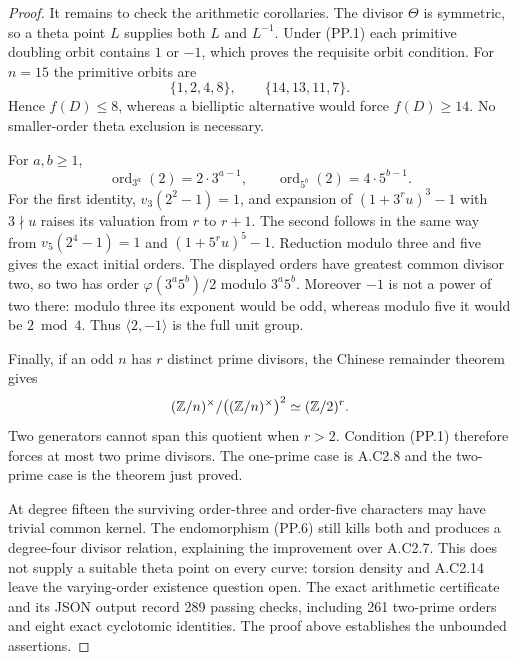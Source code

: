 \begin{proof}
It remains to check the arithmetic corollaries.
The divisor $\Theta$ is symmetric, so a theta point
$L$ supplies both $L$ and $L^{-1}$. Under (PP.1)
each primitive doubling orbit contains $1$ or $-1$,
which proves the requisite orbit condition.
For $n=15$ the primitive orbits are
\[
              \{1,2,4,8\},\qquad \{14,13,11,7\}.
\]
Hence $f(D)\le8$, whereas a bielliptic alternative
would force $f(D)\ge14$. No smaller-order
theta exclusion is necessary.

For $a,b\ge1$,
\[
 \operatorname{ord}_{3^a}(2)=2\cdot3^{a-1},\qquad
 \operatorname{ord}_{5^b}(2)=4\cdot5^{b-1}.
\]
For the first identity, $v_3(2^2-1)=1$, and expansion
of $(1+3^ru)^3-1$ with $3\nmid u$ raises its valuation
from $r$ to $r+1$. The second follows in the same
way from $v_5(2^4-1)=1$ and
$(1+5^ru)^5-1$. Reduction modulo three and five
gives the exact initial orders. The displayed
orders have greatest common divisor two, so two
has order $\varphi(3^a5^b)/2$ modulo $3^a5^b$.
Moreover $-1$ is not a power of two there:
modulo three its exponent would be odd, whereas
modulo five it would be $2\bmod4$.
Thus $\langle2,-1\rangle$ is the full unit group.

Finally, if an odd $n$ has $r$ distinct prime
divisors, the Chinese remainder theorem gives
\[
  (\mathbb Z/n)^\times/\bigl((\mathbb Z/n)^\times\bigr)^2
                    \simeq(\mathbb Z/2)^r.
\]
Two generators cannot span this quotient when
$r>2$. Condition (PP.1) therefore forces at most
two prime divisors. The one-prime case is A.C2.8
and the two-prime case is the theorem just proved.

At degree fifteen the surviving order-three and
order-five characters may have trivial common
kernel. The endomorphism (PP.6) still kills both
and produces a degree-four divisor relation,
explaining the improvement over A.C2.7.
This does not supply a suitable theta point on
every curve: torsion density and A.C2.14 leave
the varying-order existence question open.
The exact arithmetic certificate
 and its
JSON output record 289 passing checks, including
261 two-prime orders and eight exact cyclotomic
identities. The proof above establishes the
unbounded assertions.
\end{proof}
